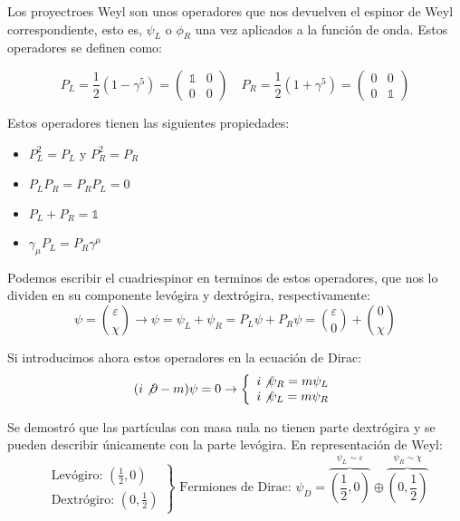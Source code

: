 \begin{definition}
  Los proyectroes Weyl son unos operadores que nos devuelven el espinor de Weyl correspondiente, esto es, $\psi_{L}$ o $\phi_{R}$ una vez aplicados a la función de onda. 
  Estos operadores se definen como:

  $$
P_{L}=\frac{1}{2}\left(1-\gamma^{5}\right)=\left(\begin{array}{ll}
\mathbb{1} & 0 \\
0 & 0
\end{array}\right) \quad P_{R}=\frac{1}{2}\left(1+\gamma^{5}\right)=\left(\begin{array}{ll}
0 & 0 \\
0 & \mathbb{1}
\end{array}\right)
$$
\end{definition}

Estos operadores tienen las siguientes propiedades:
\begin{itemize}
  \item $P_{L}^{2}=P_{L}$ y $P_{R}^{2}=P_{R}$
  \item $P_{L} P_{R}=P_{R} P_{L}=0$
  \item $P_{L}+P_{R}=\mathbb{1}$
  \item $\gamma_{\mu} P_{L}=P_{R} \gamma^{\mu}$
\end{itemize}

Podemos escribir el cuadriespinor en terminos de estos operadores, que nos lo dividen en su componente levógira y dextrógira, respectivamente:
$$
\psi=\binom{\varepsilon}{\chi} \rightarrow \psi=\psi_{L}+\psi_{R}=P_{L} \psi+P_{R} \psi=\binom{\varepsilon}{0}+\binom{0}{\chi}
$$

Si introducimos ahora estos operadores en la ecuación de Dirac:
$$
(i \not \partial-m) \psi=0 \rightarrow\left\{\begin{array}{l}
i \not \psi_{R}=m \psi_{L} \\
i \not \psi_{L}=m \psi_{R}
\end{array}\right.
$$

Se demostró que las partículas con masa nula no tienen parte dextrógira y se pueden describir únicamente con la parte levógira. En representación de Weyl:
$$
\left.\begin{array}{l}
\text { Levógiro: }\left(\frac{1}{2}, 0\right) \\
\text { Dextrógiro: }\left(0, \frac{1}{2}\right)
\end{array}\right\} \text { Fermiones de Dirac: } \psi_{D}=\overbrace{\left(\frac{1}{2}, 0\right)}^{\psi_{L} \sim \varepsilon} \oplus \overbrace{\left(0, \frac{1}{2}\right)}^{\psi_{R} \sim \chi}
$$

